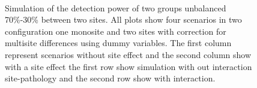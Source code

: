 \documentclass[authoryear]{elsarticle}
\begin{document}
\begin{figure}[t]
     \\
     \tiny Simulation of the detection power of two groups unbalanced 70\%-30\% between two sites. All plots show four scenarios in two configuration one monosite and two sites with correction for multisite differences using dummy variables. The first column represent scenarios without site effect and the second column show with a site effect the first row show simulation with out interaction site-pathology and the second row show with interaction.
     \label{fig_full_sim_debalancing}
 \end{figure}
 
\end{document}
